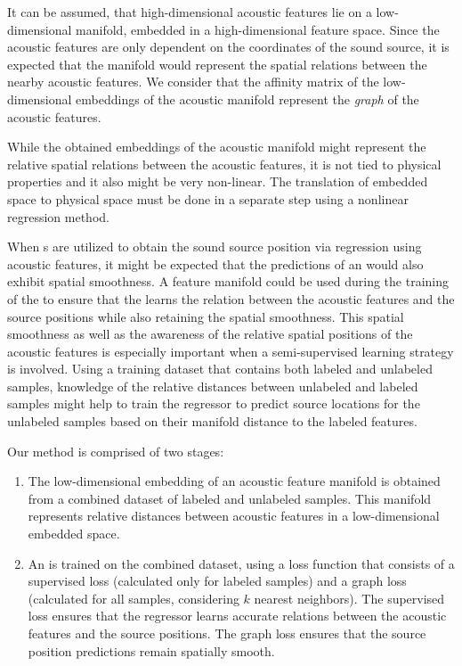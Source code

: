 \documentclass[applsci,article,submit,moreauthors,pdftex]{Definitions/mdpi}
\begin{document}
It can be assumed, that high-dimensional acoustic features lie on a low-dimensional manifold, embedded in a high-dimensional feature space. 
Since the acoustic features are only dependent on the coordinates of the sound source, it is expected that the manifold would represent the spatial relations between the nearby acoustic features. 
We consider that the affinity matrix of the low-dimensional embeddings of the acoustic manifold represent the \emph{graph} of the acoustic features.

While the obtained embeddings of the acoustic manifold might represent the relative spatial relations between the acoustic features, it is not tied to physical properties and it also might be very non-linear. The translation of embedded space to physical space must be done in a separate step using a nonlinear regression method. 

When \ann{}s are utilized to obtain the sound source position via regression using acoustic features, it might be expected that the predictions of an \ann{} would also exhibit spatial smoothness. A feature manifold could be used during the training of the \ann{} to ensure that the \ann{} learns the relation between the acoustic features and the source positions while also retaining the spatial smoothness.
This spatial smoothness as well as the awareness of the relative spatial positions of the acoustic features is especially important when a semi-supervised learning strategy is involved. Using a training dataset that contains both labeled and unlabeled samples, knowledge of the relative distances between unlabeled and labeled samples might help to train the regressor to predict source locations for the unlabeled samples based on their manifold distance to the labeled features.


Our method is comprised of two stages:
\begin{enumerate}
	\item The low-dimensional embedding of an acoustic feature manifold is obtained from a combined dataset of labeled and unlabeled samples. This manifold represents relative distances between acoustic features in a low-dimensional embedded space.
	\item An \ann{} is trained on the combined dataset, using a loss function that consists of a supervised loss (calculated only for labeled samples) and a graph loss (calculated for all samples, considering $ k $ nearest neighbors). The supervised loss ensures that the regressor learns accurate relations between the acoustic features and the source positions. The graph loss ensures that the source position predictions remain spatially smooth.
\end{enumerate}
\end{document}
